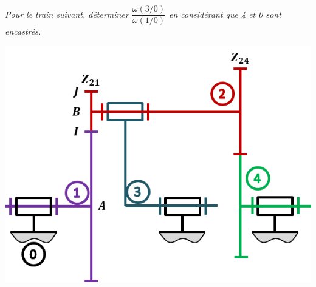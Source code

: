 \documentclass[10pt,fleqn]{article} %
\begin{document}
\begin{multicols}{2}
\subparagraph{}\textit{Pour le train suivant, déterminer $\dfrac{\omega(3/0)}{\omega(1/0)}$ en considérant que 4 et 0 sont encastrés.}

\begin{center}
\includegraphics[width=\linewidth]{images/train_04}
\end{center}


\end{multicols}
\end{document}
